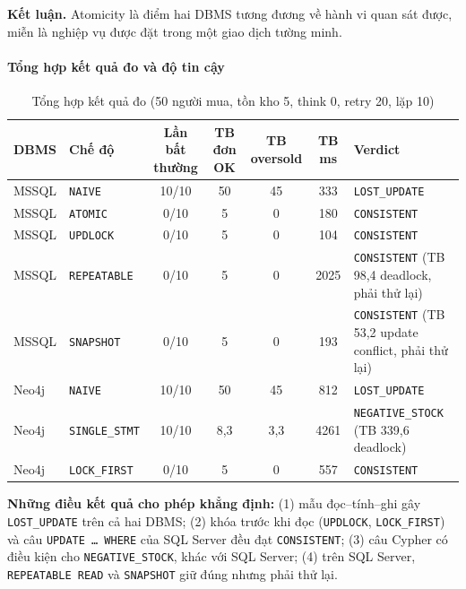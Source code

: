 \textbf{Kết luận.} Atomicity là điểm hai DBMS tương đương về hành vi quan sát được, miễn là nghiệp vụ được đặt trong một giao dịch tường minh.

\paragraph{Tổng hợp kết quả đo và độ tin cậy}
\label{par:tx-summary}\mbox{}

\begin{table}[htbp]
\centering
\caption{Tổng hợp kết quả đo (50 người mua, tồn kho 5, think 0, retry 20, lặp 10)}
\label{tab:tx-summary}
\renewcommand{\arraystretch}{1.2}
\begin{tabularx}{\textwidth}{l l c c c c X}
\toprule
\textbf{DBMS} & \textbf{Chế độ} & \textbf{Lần bất thường} & \textbf{TB đơn OK} & \textbf{TB oversold} & \textbf{TB ms} & \textbf{Verdict} \\
\midrule
MSSQL & \texttt{NAIVE} & 10/10 & 50 & 45 & 333 & \texttt{LOST\_UPDATE} \\
MSSQL & \texttt{ATOMIC} & 0/10 & 5 & 0 & 180 & \texttt{CONSISTENT} \\
MSSQL & \texttt{UPDLOCK} & 0/10 & 5 & 0 & 104 & \texttt{CONSISTENT} \\
MSSQL & \texttt{REPEATABLE} & 0/10 & 5 & 0 & 2025 & \texttt{CONSISTENT} (TB 98,4 deadlock, phải thử lại) \\
MSSQL & \texttt{SNAPSHOT} & 0/10 & 5 & 0 & 193 & \texttt{CONSISTENT} (TB 53,2 update conflict, phải thử lại) \\
Neo4j & \texttt{NAIVE} & 10/10 & 50 & 45 & 812 & \texttt{LOST\_UPDATE} \\
Neo4j & \texttt{SINGLE\_STMT} & 10/10 & 8,3 & 3,3 & 4261 & \texttt{NEGATIVE\_STOCK} (TB 339,6 deadlock) \\
Neo4j & \texttt{LOCK\_FIRST} & 0/10 & 5 & 0 & 557 & \texttt{CONSISTENT} \\
\bottomrule
\end{tabularx}
\end{table}

\textbf{Những điều kết quả cho phép khẳng định:} (1) mẫu đọc--tính--ghi gây \texttt{LOST\_UPDATE} trên cả hai DBMS; (2) khóa trước khi đọc (\texttt{UPDLOCK}, \texttt{LOCK\_FIRST}) và câu \texttt{UPDATE \ldots{} WHERE} của SQL Server đều đạt \texttt{CONSISTENT}; (3) câu Cypher có điều kiện cho \texttt{NEGATIVE\_STOCK}, khác với SQL Server; (4) trên SQL Server, \texttt{REPEATABLE READ} và \texttt{SNAPSHOT} giữ đúng nhưng phải thử lại.


